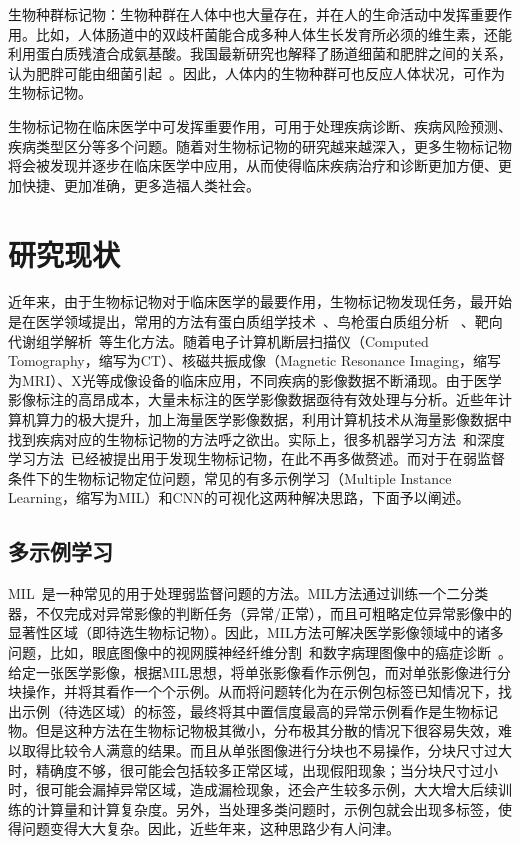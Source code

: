 生物种群标记物：生物种群在人体中也大量存在，并在人的生命活动中发挥重要作用。比如，人体肠道中的双歧杆菌能合成多种人体生长发育所必须的维生素，还能利用蛋白质残渣合成氨基酸。我国最新研究也解释了肠道细菌和肥胖之间的关系，认为肥胖可能由细菌引起~\cite{zhou2019xiao}。因此，人体内的生物种群可也反应人体状况，可作为生物标记物。

生物标记物在临床医学中可发挥重要作用，可用于处理疾病诊断、疾病风险预测、疾病类型区分等多个问题。随着对生物标记物的研究越来越深入，更多生物标记物将会被发现并逐步在临床医学中应用，从而使得临床疾病治疗和诊断更加方便、更加快捷、更加准确，更多造福人类社会。

\section{研究现状}
\label{sec:related_work}
近年来，由于生物标记物对于临床医学的最要作用，生物标记物发现任务，最开始是在医学领域提出，常用的方法有蛋白质组学技术~\cite{srinivas2002proteomics}、鸟枪蛋白质组分析~\cite{hu2008salivary} 、靶向代谢组学解析~\cite{griffiths2010targeted}等生化方法。随着电子计算机断层扫描仪（Computed Tomography，缩写为CT）、核磁共振成像（Magnetic Resonance Imaging，缩写为MRI）、X光等成像设备的临床应用，不同疾病的影像数据不断涌现。由于医学影像标注的高昂成本，大量未标注的医学影像数据亟待有效处理与分析。近些年计算机算力的极大提升，加上海量医学影像数据，利用计算机技术从海量影像数据中找到疾病对应的生物标记物的方法呼之欲出。实际上，很多机器学习方法~\cite{huynh2012statistical, he2010stable, mamoshina2018machine, swan2013application}和深度学习方法~\cite{yao2016imaging, zafeiris2018artificial, li2019efficient}已经被提出用于发现生物标记物，在此不再多做赘述。而对于在弱监督条件下的生物标记物定位问题，常见的有多示例学习（Multiple Instance Learning，缩写为MIL）和CNN的可视化这两种解决思路，下面予以阐述。

\subsection{多示例学习}
MIL~\cite{maron1998framework}是一种常见的用于处理弱监督问题的方法。MIL方法通过训练一个二分类器，不仅完成对异常影像的判断任务（异常/正常），而且可粗略定位异常影像中的显著性区域（即待选生物标记物）。因此，MIL方法可解决医学影像领域中的诸多问题，比如，眼底图像中的视网膜神经纤维分割~\cite{manivannan2017subcategory}和数字病理图像中的癌症诊断~\cite{kandemir2014empowering}。给定一张医学影像，根据MIL思想，将单张影像看作示例包，而对单张影像进行分块操作，并将其看作一个个示例。从而将问题转化为在示例包标签已知情况下，找出示例（待选区域）的标签，最终将其中置信度最高的异常示例看作是生物标记物。但是这种方法在生物标记物极其微小，分布极其分散的情况下很容易失效，难以取得比较令人满意的结果。而且从单张图像进行分块也不易操作，分块尺寸过大时，精确度不够，很可能会包括较多正常区域，出现假阳现象；当分块尺寸过小时，很可能会漏掉异常区域，造成漏检现象，还会产生较多示例，大大增大后续训练的计算量和计算复杂度。另外，当处理多类问题时，示例包就会出现多标签，使得问题变得大大复杂。因此，近些年来，这种思路少有人问津。

